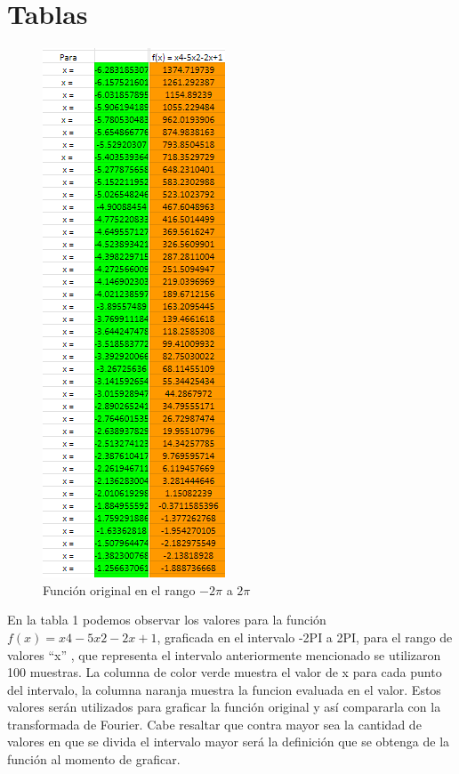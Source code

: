 
\section{Tablas}

\begin{figure}[H]
    \centering
    \includegraphics[width=2.13542in,height=6.19792in]{media/image23.png}    
    \caption{Función original en el rango \(-2\pi\) a \(2\pi\)}
\end{figure}

En la tabla 1 podemos observar los valores para la función \(f(x) = x4-5x2-2x+1\), graficada en el intervalo -2PI a 2PI, para el rango de valores ``x'' , que representa el intervalo anteriormente mencionado se utilizaron 100 muestras. La columna de color verde muestra el valor de x para cada punto del intervalo, la columna naranja muestra la funcion evaluada en el valor. Estos valores serán utilizados para graficar la función original y así compararla con la transformada de Fourier. Cabe resaltar que contra mayor sea la cantidad de valores en que se divida el intervalo mayor será la definición que se obtenga de la función al momento de graficar.


